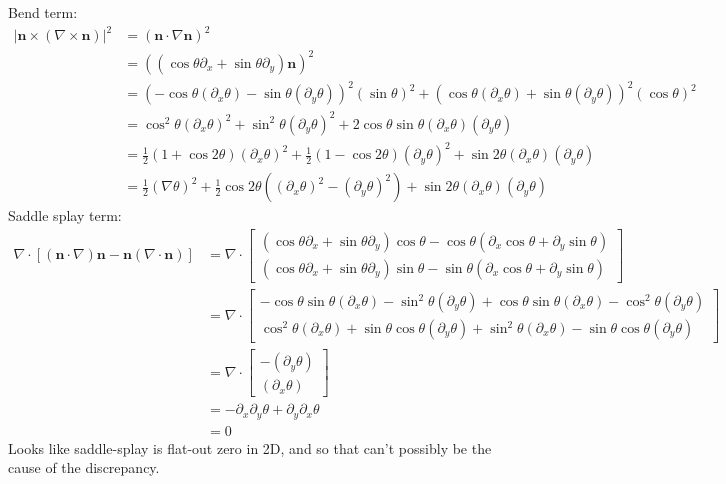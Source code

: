 \documentclass[reqno]{article}
\begin{document}
\noindent
Bend term:
\begin{equation}
\begin{split}
    \left| \mathbf{n} \times (\nabla \times \mathbf{n}) \right|^2
    &=
    (\mathbf{n} \cdot \nabla \mathbf{n})^2 \\
    &=
    ((\cos\theta \partial_x + \sin\theta \partial_y) \mathbf{n})^2 \\
    &=
    (-\cos\theta (\partial_x \theta) -\sin\theta (\partial_y \theta))^2 (\sin\theta)^2
    + (\cos\theta(\partial_x \theta) + \sin\theta(\partial_y \theta))^2 (\cos\theta)^2 \\
    &= \cos^2\theta(\partial_x \theta)^2 + \sin^2\theta(\partial_y \theta)^2
    + 2\cos\theta \sin\theta (\partial_x \theta)(\partial_y \theta) \\
    &=
    \tfrac12 (1 + \cos2\theta) (\partial_x \theta)^2
    + \tfrac12 (1 - \cos2\theta) (\partial_y \theta)^2
    + \sin2\theta (\partial_x \theta)(\partial_y \theta) \\
    &= 
    \tfrac12 (\nabla \theta)^2
    + \tfrac12 \cos2\theta \left((\partial_x \theta)^2 - (\partial_y \theta)^2\right)
    + \sin2\theta (\partial_x \theta)(\partial_y \theta)
\end{split}
\end{equation}
Saddle splay term:
\begin{equation}
\begin{split}
    \nabla \cdot \left[(\mathbf{n} \cdot \nabla) \mathbf{n} - \mathbf{n} (\nabla \cdot \mathbf{n})\right]
    &=
    \nabla \cdot
    \begin{bmatrix}
        \left(\cos\theta \partial_x + \sin\theta \partial_y\right) \cos\theta 
        - \cos\theta \left(\partial_x \cos\theta + \partial_y \sin\theta\right) \\
        \left(\cos\theta \partial_x + \sin\theta \partial_y\right) \sin\theta
        - \sin\theta \left(\partial_x \cos\theta + \partial_y \sin\theta \right)
    \end{bmatrix} \\
    &=
    \nabla \cdot
    \begin{bmatrix}
        -\cos\theta \sin\theta (\partial_x \theta) - \sin^2\theta(\partial_y \theta)
        + \cos\theta \sin\theta (\partial_x \theta) - \cos^2\theta(\partial_y \theta) \\
        \cos^2\theta (\partial_x \theta) + \sin\theta \cos\theta (\partial_y \theta)
        + \sin^2\theta (\partial_x \theta) - \sin\theta \cos\theta (\partial_y \theta )
    \end{bmatrix} \\
    &=
    \nabla \cdot
    \begin{bmatrix}
        -(\partial_y \theta) \\
        (\partial_x \theta)
    \end{bmatrix} \\
    &=
    -\partial_x \partial_y \theta
    + \partial_y \partial_x \theta \\
    &=
    0
\end{split}
\end{equation}
Looks like saddle-splay is flat-out zero in 2D, and so that can't possibly be the cause of the discrepancy.
\end{document}

